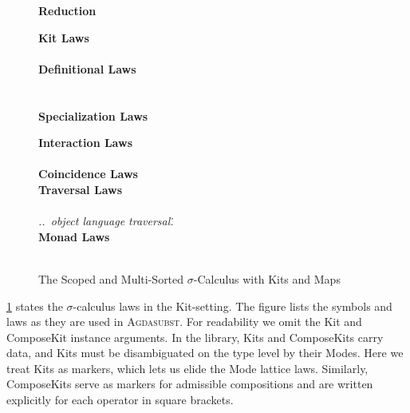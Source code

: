 \documentclass[screen,nonacm]{acmart}
\begin{document}
\begin{figure}[tp]
      {\raggedright{} \vspace{2.0em} \textbf{\Large Reduction} \par}
      \vspace{1.5em}
      \begin{minipage}[t]{0.40\textwidth}
            \small{}
            \raggedright{}
            \textbf{Kit Laws}\\
            \ETypeLevel{}\\
            \vspace{0.5em}
            \textbf{Definitional Laws}\\
            \vspace{0.5em}
            \EDefLawTy{}\\
            \vspace{0.5em}
            \EDefLaw{}\\
            \vspace{0.5em}
            \textbf{Specialization Laws}
            \ESpecialDefLaws{}
      \end{minipage}
      \hfill
      \begin{minipage}[t]{0.54\textwidth}
            \small{}
            \raggedright{}
            \textbf{Interaction Laws}\\
            \EInteraction{}\\
            \vspace{0.5em}
            \textbf{Coincidence Laws}\\
            \ECoincidence{}
            \vspace{0.5em}
            \textbf{Traversal Laws}\\
            \ETravL{}\\
            \emph{..\ object language traversal\..}\\
            \vspace{0.5em}
            \textbf{Monad Laws}\\
            \EMonad{}\\
      \end{minipage}
      \caption{The Scoped and Multi-Sorted $σ$-Calculus with Kits and Maps}\label{fig:ags-fin}
\end{figure}

\cref{fig:ags-fin} states the $σ$-calculus laws in the Kit-setting.
The figure lists the symbols and laws as they are used in \textsc{Agdasubst}.
For readability we omit the Kit and ComposeKit instance arguments. In the
library, Kits and ComposeKits carry data, and Kits must be disambiguated on the
type level by their Modes. Here we treat Kits as markers, which lets us elide
the Mode lattice laws. Similarly, ComposeKits serve as markers for admissible
compositions and are written explicitly for each operator in square brackets.
\end{document}
